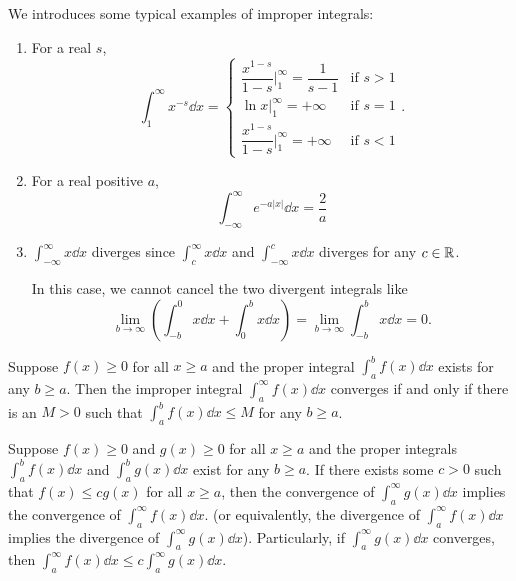 \documentclass[a4paper]{ctexart}
\begin{document}
    \begin{myex}
        We introduces some typical examples of improper integrals:
        \begin{enumerate}[label=(\arabic*)]
            \item For a real $s$,
            \[
            \int_1^\infty x^{-s} \dd x = \begin{cases}
            \dfrac{x^{1-s}}{1-s} \Big|_1^\infty = \dfrac{1}{s-1} & \text{if } s>1\\[6pt]
            \ln x \Big|_1^\infty = +\infty & \text{if } s=1\\[6pt]
            \dfrac{x^{1-s}}{1-s} \Big|_1^\infty = +\infty & \text{if } s<1
            \end{cases}.
            \]
            \item For a real positive $a$,
            \[
            \int_{-\infty}^\infty e^{-a|x|} \dd x = \frac{2}{a}
            \]
            \item $\displaystyle \int_{-\infty}^\infty x \dd x$ diverges since $\displaystyle \int_c^\infty x \dd x$ and $\displaystyle \int_{-\infty}^c x \dd x$ diverges for any $c\in \mathbb{R}$.
            
            In this case, we cannot cancel the two divergent integrals like
            \[
            \lim_{b\to \infty} (\int_{-b}^0 x \dd x + \int_0^b x \dd x) = \lim_{b\to \infty} \int_{-b}^b x \dd x = 0.
            \]
            
            \end{enumerate}
    \end{myex}
    \begin{mythm}
        Suppose $f(x)\ge 0$ for all $x\ge a$ and the proper integral $\displaystyle \int_a^b f(x) \dd x$ exists for any $b\ge a$. Then the improper integral $\displaystyle \int_a^\infty f(x) \dd x$ converges if and only if there is an $M>0$ such that $\displaystyle \int_a^b f(x) \dd x \le M$ for any $b\ge a$.
    \end{mythm}
    \begin{mythm}
        Suppose $f(x)\ge 0$ and $g(x)\ge 0$ for all $x\ge a$ and the proper integrals $\displaystyle \int_a^b f(x) \dd x$ and $\displaystyle \int_a^b g(x) \dd x$ exist for any $b\ge a$. If there exists some $c>0$ such that $f(x) \le c g(x)$ for all $x\ge a$, then the convergence of $\displaystyle \int_a^\infty g(x) \dd x$ implies the convergence of $\displaystyle \int_a^\infty f(x) \dd x$. (or equivalently, the divergence of $\displaystyle \int_a^\infty f(x) \dd x$ implies the divergence of $\displaystyle \int_a^\infty g(x) \dd x$). Particularly, if $\displaystyle \int_a^\infty g(x) \dd x$ converges, then $\displaystyle \int_a^\infty f(x) \dd x \le c \int_a^\infty g(x) \dd x$.
    \end{mythm}
\end{document}
